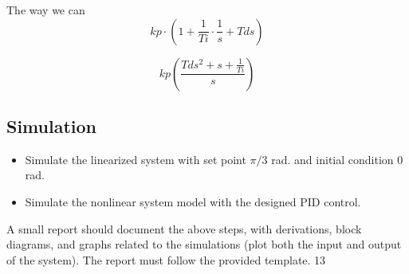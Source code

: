 \documentclass[12pt]{article}
\begin{document}
The way we can 
\begin{equation}
  kp\cdot(1+\frac{1}{Ti}\cdot \frac{1}{s}+Tds)
\end{equation}

\begin{equation}
  kp(\frac{Tds^2 + s + \frac{1}{Ti}}{s})
\end{equation}

\subsection*{Simulation}

\begin{itemize}
  \item Simulate the linearized system with set point $\pi/3$ rad. and initial condition 0 rad.
  \item Simulate the nonlinear system model with the designed PID control.
\end{itemize}

A small report should document the above steps, with derivations, block diagrams, and graphs related
to the simulations (plot both the input and output of the system). The report must follow the provided
template.
13
\end{document}
